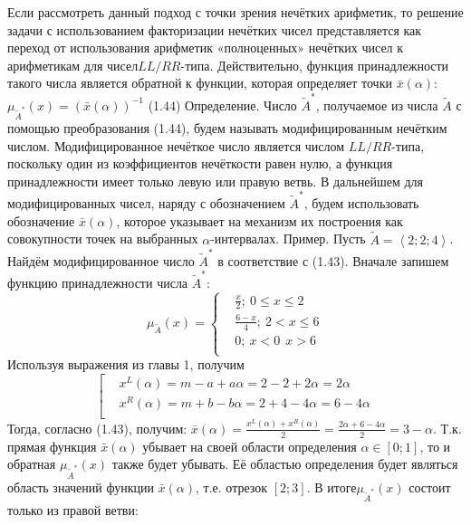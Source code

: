 Если рассмотреть данный подход с точки зрения нечётких арифметик, то решение задачи с использованием факторизации нечётких чисел представляется как переход от использования арифметик «полноценных» нечётких чисел к арифметикам для чисел$LL/RR$-типа. Действительно, функция принадлежности такого числа является обратной к функции, которая определяет точки $\bar{x}\left( \alpha  \right)$:
	${{\mu }_{{{{\tilde{A}}}^{*}}}}\left( x \right)={{\left( \bar{x}\left( \alpha  \right) \right)}^{-1}}$ 	(1.44)
Определение. Число ${{\tilde{A}}^{*}}$, получаемое из числа $\tilde{A}$ с помощью преобразования (1.44), будем называть модифицированным нечётким числом. Модифицированное нечёткое число является числом $LL/RR$-типа, поскольку один из коэффициентов нечёткости равен нулю, а функция принадлежности имеет только левую или правую ветвь. В дальнейшем для модифицированных чисел, наряду с обозначением ${{\tilde{A}}^{*}}$, будем использовать обозначение $\bar{x}\left( \alpha  \right)$, которое указывает на механизм их построения как совокупности точек на выбранных $\alpha $-интервалах.
Пример. Пусть $\tilde{A}=\left\langle 2;2;4 \right\rangle $. Найдём модифицированное число ${{\tilde{A}}^{*}}$ в соответствие с (1.43).
Вначале запишем функцию принадлежности числа ${{\tilde{A}}^{*}}$:
	\[{{\mu }_{{\tilde{A}}}}\left( x \right)=\left\{ \begin{aligned}
  & \frac{x}{2};\ 0\le x\le 2 \\ 
 & \frac{6-x}{4};\ 2<x\le 6 \\ 
 & 0;\ x<0\ \ x>6 \\ 
\end{aligned} \right.\] 
Используя выражения из главы 1, получим
	\[\left[ \begin{aligned}
  & {{x}^{L}}\left( \alpha  \right)=m-a+a\alpha =2-2+2\alpha =2\alpha  \\ 
 & {{x}^{R}}\left( \alpha  \right)=m+b-b\alpha =2+4-4\alpha =6-4\alpha  \\ 
\end{aligned} \right.\] 
Тогда, согласно (1.43), получим:
	$\bar{x}\left( \alpha  \right)=\frac{{{x}^{L}}\left( \alpha  \right)+{{x}^{R}}\left( \alpha  \right)}{2}=\frac{2\alpha +6-4\alpha }{2}=3-\alpha $.
Т.к. прямая функция $\bar{x}\left( \alpha  \right)$ убывает на своей области определения $\alpha \in \left[ 0;1 \right]$, то и обратная ${{\mu }_{{{{\tilde{A}}}^{*}}}}\left( x \right)$ также будет убывать. Её областью определения будет являться область значений функции $\bar{x}\left( \alpha  \right)$, т.е. отрезок $\left[ 2;3 \right]$. В итоге${{\mu }_{{{{\tilde{A}}}^{*}}}}\left( x \right)$ состоит только из правой ветви:
